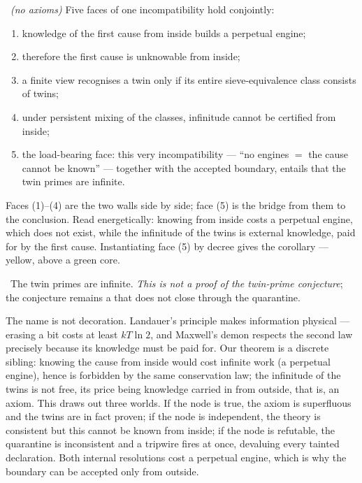 \begin{theorem}\label{thm:higherEnergyIncompatibility_main}
\green{}\ \emph{(no axioms)} Five faces of one incompatibility hold conjointly:
\begin{enumerate}[label=\textup{(\arabic*)},leftmargin=2.2em,itemsep=1pt]
\item knowledge of the first cause from inside builds a perpetual engine;
\item therefore the first cause is unknowable from inside;
\item a finite view recognises a twin only if its entire sieve-equivalence class consists of twins;
\item under persistent mixing of the classes, infinitude cannot be certified from inside;
\item the load-bearing face: this very incompatibility --- ``no engines $=$ the cause cannot be
  known'' --- together with the accepted boundary, entails that the twin primes are infinite.
\end{enumerate}
\end{theorem}

Faces (1)--(4) are the two walls side by side; face (5) is the bridge from them to the conclusion.
Read energetically: knowing from inside costs a perpetual engine, which does not exist, while the
infinitude of the twins is external knowledge, paid for by the first cause. Instantiating face (5) by
decree gives the corollary --- yellow, above a green core.

\begin{corollary}\label{thm:higherEnergyIncompatibility_twins}
\yellow{}\ The twin primes are infinite. \emph{This is not a proof of the twin-prime conjecture}; the
conjecture remains a  that does not close through the quarantine.
\end{corollary}

\begin{remark}
The name is not decoration. Landauer's principle makes information physical --- erasing a bit costs
at least $kT\ln 2$, and Maxwell's demon respects the second law precisely because its knowledge must
be paid for. Our theorem is a discrete sibling: knowing the cause from inside would cost infinite work
(a perpetual engine), hence is forbidden by the same conservation law; the infinitude of the twins is
not free, its price being knowledge carried in from outside, that is, an axiom. This draws out three
worlds. If the node is true, the axiom is superfluous and the twins are in fact proven; if the node is
independent, the theory is consistent but this cannot be known from inside; if the node is refutable,
the quarantine is inconsistent and a tripwire fires at once, devaluing every tainted declaration. Both
internal resolutions cost a perpetual engine, which is why the boundary can be accepted only from
outside.
\end{remark}
